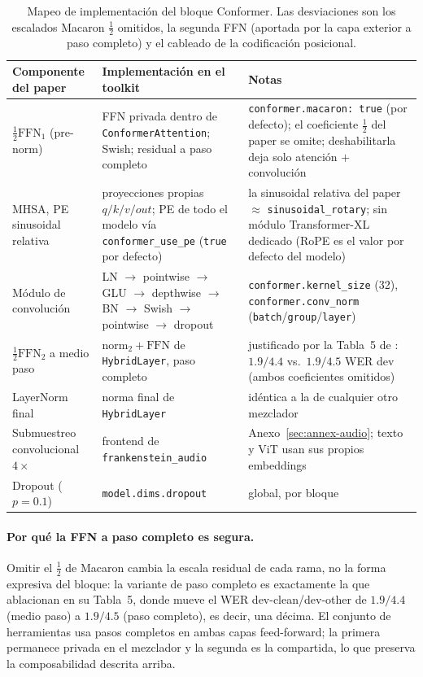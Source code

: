 \begin{table}[H]
\centering
\small
\begin{tabularx}{0.95\linewidth}{L{3.6cm}L{4.4cm}X}
\toprule
\textbf{Componente del paper} & \textbf{Implementación en el toolkit} & \textbf{Notas} \\
\midrule
$\tfrac{1}{2}\mathrm{FFN}_1$ (pre-norm) & FFN privada dentro de \texttt{ConformerAttention}; Swish; residual a paso completo & \texttt{conformer.macaron: true} (por defecto); el coeficiente $\tfrac12$ del paper se omite; deshabilitarla deja solo atención $+$ convolución \\
MHSA, PE sinusoidal relativa & proyecciones propias $q/k/v/out$; PE de todo el modelo vía \texttt{conformer\_use\_pe} (\texttt{true} por defecto) & la sinusoidal relativa del paper $\approx$ \texttt{sinusoidal\_rotary}; sin módulo Transformer-XL dedicado (RoPE es el valor por defecto del modelo) \\
Módulo de convolución & LN $\to$ pointwise $\to$ GLU $\to$ depthwise $\to$ BN $\to$ Swish $\to$ pointwise $\to$ dropout & \texttt{conformer.kernel\_size} (32), \texttt{conformer.conv\_norm} (\texttt{batch}/\texttt{group}/\texttt{layer}) \\
$\tfrac{1}{2}\mathrm{FFN}_2$ a medio paso & $\mathrm{norm}_2 + \mathrm{FFN}$ de \texttt{HybridLayer}, paso completo & justificado por la Tabla~5 de \citet{Gulati2020}: $1.9/4.4$ vs.\ $1.9/4.5$ WER dev (ambos coeficientes omitidos) \\
LayerNorm final & norma final de \texttt{HybridLayer} & idéntica a la de cualquier otro mezclador \\
Submuestreo convolucional $4\times$ & frontend de \texttt{frankenstein\_audio} & Anexo~\ref{sec:annex-audio}; texto y ViT usan sus propios embeddings \\
Dropout ($p=0.1$) & \texttt{model.dims.dropout} & global, por bloque \\
\bottomrule
\end{tabularx}
\caption{Mapeo de implementación del bloque Conformer. Las desviaciones son los escalados Macaron $\tfrac12$ omitidos, la segunda FFN (aportada por la capa exterior a paso completo) y el cableado de la codificación posicional.}
\label{tab:conformer-mapping}
\end{table}

\paragraph{Por qué la FFN a paso completo es segura.} Omitir el $\tfrac12$ de Macaron cambia la escala residual de cada rama, no la forma expresiva del bloque: la variante de paso completo es exactamente la que \citet{Gulati2020} ablacionan en su Tabla~5, donde mueve el WER dev-clean/dev-other de $1.9/4.4$ (medio paso) a $1.9/4.5$ (paso completo), es decir, una décima. El conjunto de herramientas usa pasos completos en ambas capas feed-forward; la primera permanece privada en el mezclador y la segunda es la compartida, lo que preserva la composabilidad descrita arriba.


